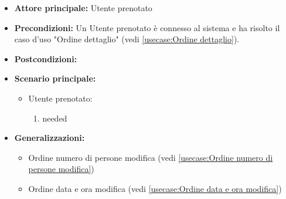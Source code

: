 \label{usecase:Ordine modifica}
\begin{itemize}
\item \textbf{Attore principale:} Utente prenotato
\item \textbf{Precondizioni:}
Un Utente prenotato è connesso al sistema e ha risolto il caso d'uso "Ordine dettaglio" (vedi \autoref{usecase:Ordine dettaglio}).
\item \textbf{Postcondizioni:}
\item \textbf{Scenario principale:}
\begin{itemize}
\item Utente prenotato:
\begin{enumerate}
\item needed
\end{enumerate}
\end{itemize}
\item \textbf{Generalizzazioni:}
\begin{itemize}
\item Ordine numero di persone modifica (vedi \autoref{usecase:Ordine numero di persone modifica})\item Ordine data e ora modifica (vedi \autoref{usecase:Ordine data e ora modifica})
\end{itemize}
\end{itemize}